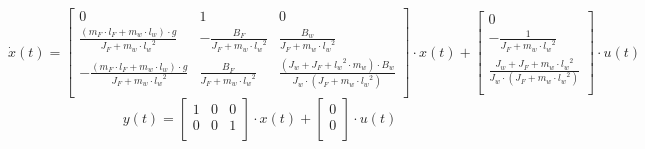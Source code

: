\begin{equation}  \label{xDotSS}
	\dot{x}(t) = 
	\begin{bmatrix}
		0 & 1 & 0 \\
		\frac{(m_F \cdot l_F + m_w \cdot l_w) \cdot g}{J_F + m_w \cdot {l_w}^2} & -\frac{B_F}{J_F + m_w \cdot {l_w}^2} & \frac{B_w}{J_F + m_w \cdot {l_w}^2} \\
		- \frac{(m_F \cdot l_F + m_w \cdot l_w) \cdot g}{J_F+m_w \cdot {l_w}^{2}} & \frac{B_F}{J_F+m_w \cdot {l_w}^{2}} & \frac{(J_w+J_F+{l_w}^{2} \cdot m_w) \cdot B_w}{J_w \cdot (J_F+m_w \cdot  {l_w}^2)} \\
	\end{bmatrix}
	\cdot x(t) +
	\begin{bmatrix}
		0 \\
		- \frac{1}{J_F + m_w \cdot {l_w}^2} \\
		\frac{J_w+J_F+m_w \cdot {l_w}^{2}}{J_w \cdot (J_F+m_w \cdot {l_w}^{2})} \\
	\end{bmatrix}
	\cdot u(t)
\end{equation}
\begin{equation} \label{ySS}
	y(t) = 
	\begin{bmatrix}
		1 & 0 & 0 \\
		0 & 0 & 1 \\
	\end{bmatrix}
	\cdot x(t) +
	\begin{bmatrix}
		0 \\
		0 \\
	\end{bmatrix}
\cdot u(t)
\end{equation}

